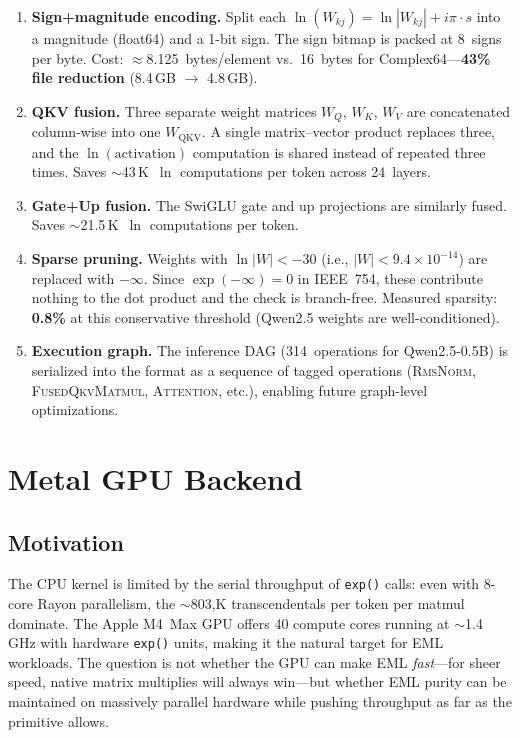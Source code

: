 \documentclass[acmsmall,nonacm]{acmart}
\begin{document}
\begin{enumerate}
\item \textbf{Sign+magnitude encoding.}
  Split each $\ln(W_{kj}) = \ln|W_{kj}| + i\pi\cdot s$ into a
  magnitude (float64) and a 1-bit sign.  The sign bitmap is packed at
  8~signs per byte.  Cost: $\approx$8.125~bytes/element vs.\
  16~bytes for Complex64---\textbf{43\% file reduction} (8.4\,GB $\to$
  4.8\,GB).

\item \textbf{QKV fusion.}
  Three separate weight matrices $W_Q$, $W_K$, $W_V$ are concatenated
  column-wise into one $W_{\text{QKV}}$.  A single matrix--vector
  product replaces three, and the $\ln(\text{activation})$ computation
  is shared instead of repeated three times.  Saves $\sim$43\,K~$\ln$
  computations per token across 24~layers.

\item \textbf{Gate+Up fusion.}
  The SwiGLU gate and up projections are similarly fused.  Saves
  $\sim$21.5\,K~$\ln$ computations per token.

\item \textbf{Sparse pruning.}
  Weights with $\ln|W| < -30$ (i.e., $|W| < 9.4 \times 10^{-14}$)
  are replaced with $-\infty$.  Since $\exp(-\infty) = 0$ in IEEE~754,
  these contribute nothing to the dot product and the check is
  branch-free.  Measured sparsity: \textbf{0.8\%} at this conservative
  threshold (Qwen2.5 weights are well-conditioned).

\item \textbf{Execution graph.}
  The inference DAG (314~operations for Qwen2.5-0.5B) is serialized
  into the format as a sequence of tagged operations (\textsc{RmsNorm},
  \textsc{FusedQkvMatmul}, \textsc{Attention}, etc.), enabling
  future graph-level optimizations.
\end{enumerate}


\section{Metal GPU Backend}
\label{sec:gpu}

\subsection{Motivation}

The CPU kernel is limited by the serial throughput of \texttt{exp()}
calls: even with 8-core Rayon parallelism, the $\sim$803{,}K
transcendentals per token per matmul dominate.  The Apple M4~Max GPU
offers 40 compute cores running at $\sim$1.4\,GHz with hardware
\texttt{exp()} units, making it the natural target for EML workloads.
The question is not whether the GPU can make EML \emph{fast}---for
sheer speed, native matrix multiplies will always win---but whether
EML purity can be maintained on massively parallel hardware while
pushing throughput as far as the primitive allows.
\end{document}
